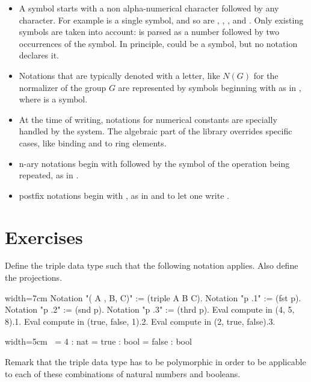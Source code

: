 \begin{itemize}
\item A symbol starts with a non alpha-numerical character followed by
	any character.  For example  is a single symbol, and so are
	, \C{\%/}, \C{<=}, and \C{[::}.  Only existing
	symbols are taken into account:  is parsed as a number
	followed by two occurrences of the  symbol.  In principle,
          could be a symbol, but no notation declares it.
\item Notations that are typically denoted with a letter, like $N(G)$ for the
	normalizer of the group $G$ are represented by symbols beginning
	with  as in , where  is a symbol.
\item At the time of writing, notations for numerical constants are specially
	handled by the system.  The algebraic part of the library overrides
	specific cases, like binding  and  to ring elements.
\item n-ary notations begin with \C{[} followed by the symbol of the
	operation being repeated, as in .
\item postfix notations begin with , as in  and 
	to let one write .
\end{itemize}



\newpage
\section{Exercises}

\begin{Exercise}[label=ex:triple,difficulty=0,title={The triple data type}]
Define the triple data type such that the following notation
applies.  Also define the projections.

\begin{coq}{}{width=7cm}
Notation "( A , B, C)" := (triple A B C).
Notation "p .1" := (fst p).
Notation "p .2" := (snd p).
Notation "p .3" := (thrd p).
Eval compute in (4, 5, 8).1.
Eval compute in (true, false, 1).2.
Eval compute in (2, true, false).3.
\end{coq}
\begin{coqout}{}{width=5cm}
$~$
     = 4 : nat
     = true : bool
     = false : bool
\end{coqout}
Remark that the triple data type has to be polymorphic in order to
be applicable to each of these combinations of natural numbers and
booleans.
\end{Exercise}

